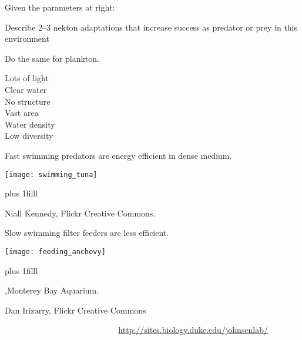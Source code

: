 \documentclass[t]{beamer}
\begin{document}
\begin{frame}[t]{Given the parameters at right:}
	\begin{multicols}{2}
		\hangpara Describe 2–3 nekton adaptations that increase success as predator or prey in this environment

		\hangpara Do the same for plankton.
	\columnbreak
	
		Lots of light\\
		Clear water\\
		No structure\\
		Vast area\\
		Water density\\
		Low diversity
	\end{multicols}

\end{frame}

\begin{frame}[t]{Fast swimming predators are energy efficient in dense medium.}

	\texttt{[image: swimming\_tuna]}

	\vskip0pt plus 1filll

	\tiny Niall Kennedy, Flickr Creative Commons.
\end{frame}

\begin{frame}[t]{Slow swimming filter feeders are less efficient.}

	\texttt{[image: feeding\_anchovy]}

	\vskip0pt plus 1filll

	\tiny \textcopyright,Monterey Bay Aquarium.
\end{frame}


{
\begin{frame}[b]
\tiny Dan Irizarry, Flickr Creative Commons
\end{frame}
}

{
\begin{frame}[b]
\tiny\textcolor{white}{Johnson Lab, Duke University, \url{http://sites.biology.duke.edu/johnsenlab/}}
\end{frame}
}
\end{document}
